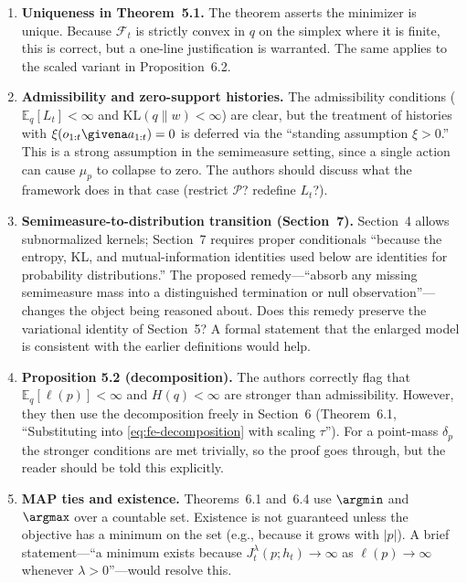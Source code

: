 \documentclass[11pt]{article}
\begin{document}
\begin{enumerate}[leftmargin=*]
\item \textbf{Uniqueness in Theorem~5.1.} The theorem asserts the minimizer is unique. Because $\mathcal{F}_t$ is strictly convex in $q$ on the simplex where it is finite, this is correct, but a one-line justification is warranted. The same applies to the scaled variant in Proposition~6.2.

\item \textbf{Admissibility and zero-support histories.} The admissibility conditions ($\mathbb{E}_q[L_t] < \infty$ and $\mathrm{KL}(q\|w) < \infty$) are clear, but the treatment of histories with $\xi(o_{1:t}\givena a_{1:t}) = 0$ is deferred via the ``standing assumption $\xi > 0$.'' This is a strong assumption in the semimeasure setting, since a single action can cause $\mu_p$ to collapse to zero. The authors should discuss what the framework does in that case (restrict $\mathcal{P}$? redefine $L_t$?).

\item \textbf{Semimeasure-to-distribution transition (Section~7).} Section~4 allows subnormalized kernels; Section~7 requires proper conditionals ``because the entropy, KL, and mutual-information identities used below are identities for probability distributions.'' The proposed remedy---``absorb any missing semimeasure mass into a distinguished termination or null observation''---changes the object being reasoned about. Does this remedy preserve the variational identity of Section~5? A formal statement that the enlarged model is consistent with the earlier definitions would help.

\item \textbf{Proposition 5.2 (decomposition).} The authors correctly flag that $\mathbb{E}_q[\ell(p)] < \infty$ and $H(q) < \infty$ are stronger than admissibility. However, they then use the decomposition freely in Section~6 (Theorem~6.1, ``Substituting into \eqref{eq:fe-decomposition} with scaling $\tau$''). For a point-mass $\delta_p$ the stronger conditions are met trivially, so the proof goes through, but the reader should be told this explicitly.

\item \textbf{MAP ties and existence.} Theorems~6.1 and~6.4 use $\argmin$ and $\argmax$ over a countable set. Existence is not guaranteed unless the objective has a minimum on the set (e.g., because it grows with $|p|$). A brief statement---``a minimum exists because $J_t^\lambda(p;h_t) \to \infty$ as $\ell(p)\to\infty$ whenever $\lambda > 0$''---would resolve this.


\end{enumerate}
\end{document}
